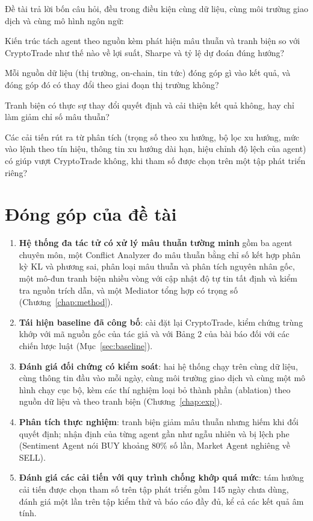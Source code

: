 Đề tài trả lời bốn câu hỏi, đều trong điều kiện cùng dữ liệu, cùng môi trường giao dịch và cùng mô hình ngôn ngữ:
\begin{description}[leftmargin=1.2cm,style=nextline]
  \item[RQ1] Kiến trúc tách agent theo nguồn kèm phát hiện mâu thuẫn và tranh biện so với CryptoTrade như thế nào về
  lợi suất, Sharpe và tỷ lệ dự đoán đúng hướng?
  \item[RQ2] Mỗi nguồn dữ liệu (thị trường, on-chain, tin tức) đóng góp gì vào kết quả, và đóng góp đó có thay đổi theo
  giai đoạn thị trường không?
  \item[RQ3] Tranh biện có thực sự thay đổi quyết định và cải thiện kết quả không, hay chỉ làm giảm chỉ số mâu thuẫn?
  \item[RQ4] Các cải tiến rút ra từ phân tích (trọng số theo xu hướng, bộ lọc xu hướng, mức vào lệnh theo tín hiệu, thông
  tin xu hướng dài hạn, hiệu chỉnh độ lệch của agent) có giúp vượt CryptoTrade không, khi tham số được chọn trên một tập
  phát triển riêng?
\end{description}

\section{Đóng góp của đề tài}
\begin{enumerate}
  \item \textbf{Hệ thống đa tác tử có xử lý mâu thuẫn tường minh} gồm ba agent chuyên môn, một Conflict Analyzer đo mâu
  thuẫn bằng chỉ số kết hợp phân kỳ KL và phương sai, phân loại mâu thuẫn và phân tích nguyên nhân gốc, một mô-đun
  tranh biện nhiều vòng với cập nhật độ tự tin tất định và kiểm tra nguồn trích dẫn, và một Mediator tổng hợp có trọng
  số (Chương~\ref{chap:method}).
  \item \textbf{Tái hiện baseline đã công bố}: cài đặt lại CryptoTrade, kiểm chứng trùng khớp với mã nguồn gốc của tác
  giả và với Bảng 2 của bài báo đối với các chiến lược luật (Mục~\ref{sec:baseline}).
  \item \textbf{Đánh giá đối chứng có kiểm soát}: hai hệ thống chạy trên cùng dữ liệu, cùng thông tin đầu vào mỗi ngày,
  cùng môi trường giao dịch và cùng một mô hình chạy cục bộ, kèm các thí nghiệm loại bỏ thành phần (ablation) theo
  nguồn dữ liệu và theo tranh biện (Chương~\ref{chap:exp}).
  \item \textbf{Phân tích thực nghiệm}: tranh biện giảm mâu thuẫn nhưng hiếm khi đổi quyết định; nhận định của từng agent
  gần như ngẫu nhiên và bị lệch phe (Sentiment Agent nói BUY khoảng 80\% số lần, Market Agent nghiêng về SELL).
  \item \textbf{Đánh giá các cải tiến với quy trình chống khớp quá mức}: tám hướng cải tiến được chọn tham số trên tập phát
  triển gồm 145 ngày chưa dùng, đánh giá một lần trên tập kiểm thử và báo cáo đầy đủ, kể cả các kết quả âm tính.
\end{enumerate}

